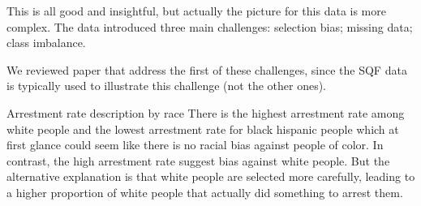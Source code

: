 This is all good and insightful, but actually the picture for this data is more complex.
The data introduced three main challenges: selection bias; missing data; class imbalance.

We reviewed paper that address the first of these challenges, since the SQF data is typically used to illustrate this challenge (not the other ones).

Arrestment rate description by race
There is the highest arrestment rate among white people and the lowest arrestment rate for black hispanic people
which at first glance could seem like there is no racial bias against people of color. In contrast, the high arrestment rate
suggest bias against white people. But the alternative explanation is that white people are selected more carefully,
leading to a higher proportion of white people that actually did something to arrest them.